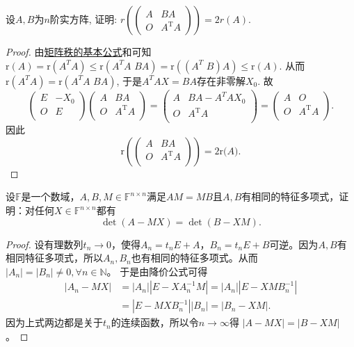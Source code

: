 \documentclass[../../main.tex]{subfiles}
\begin{document}
\begin{example}
设$A,B$为$n$阶实方阵, 证明: $r\left(\begin{pmatrix} A & BA \\ O & A^{\mathrm{T}}A \end{pmatrix}\right)=2r(A)$.
\end{example}
\begin{proof}
由\hyperref[proposition:矩阵秩的基本公式]{矩阵秩的基本公式}和可知
$\mathrm{r}\left( A \right) =\mathrm{r}\left( A^TA \right) \leqslant \mathrm{r}\left( A^TA\,\,BA \right) =\mathrm{r}\left( \left( A^T\,\,B \right) A \right) \leqslant \mathrm{r}\left( A \right) .$
从而$\mathrm{r}\left( A^TA \right) =\mathrm{r}\left( A^TA\,\,BA \right) $, 于是$A^TAX=BA$存在非零解$X_0$. 故
$$\left( \begin{matrix}
E&		-X_0\\
O&		E\\
\end{matrix} \right) \left( \begin{matrix}
A&		BA\\
O&		A^{\mathrm{T}}A\\
\end{matrix} \right) =\left( \begin{matrix}
A&		BA-A^TAX_0\\
O&		A^{\mathrm{T}}A\\
\end{matrix} \right) =\left( \begin{matrix}
A&		O\\
O&		A^{\mathrm{T}}A\\
\end{matrix} \right) .$$
因此
$$\mathrm{r}\left( \left( \begin{matrix}
A&		BA\\
O&		A^{\mathrm{T}}A\\
\end{matrix} \right) \right) =2\mathrm{r(}A).$$
\end{proof}

\begin{example}
设$\mathbb{F}$是一个数域，$A,B,M \in \mathbb{F}^{n \times n}$满足$AM = MB$且$A,B$有相同的特征多项式，证明：对任何$X \in \mathbb{F}^{n \times n}$都有
\[
\det (A - MX) = \det (B - XM). 
\]
\end{example}
\begin{proof}
设有理数列$t_n\rightarrow 0$，使得$A_n=t_nE+A$，$B_n=t_nE+B$可逆。因为$A,B$有相同特征多项式，所以$A_n,B_n$也有相同的特征多项式。从而 $|A_n|=|B_n|\ne 0,\forall n\in \mathbb{N}$。
于是由降价公式可得
\begin{align*}
|A_n - MX| &= |A_n| |E - X A_n^{-1} M| = |A_n| |E - X M B_n^{-1}| \\
&= |E - M X B_n^{-1}| |B_n| = |B_n - X M|.
\end{align*}
因为上式两边都是关于$t_n$的连续函数，所以令$n\rightarrow \infty$得 $|A - MX| = |B - X M|$。
\end{proof}
\end{document}
